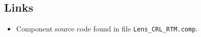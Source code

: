 \subsection*{Links}
\begin{itemize}
  \item Component source code found in file \texttt{Lens\_CRL\_RTM.comp}.
\end{itemize}
